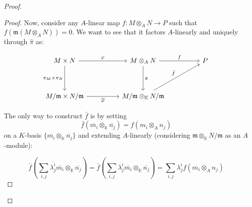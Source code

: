 \begin{problem}
\begin{enumerate}[label=(\theproblem.\arabic*),ref=\theproblem.\arabic*]
\begin{sol}
\begin{proof}
\begin{claim}
\begin{proof}
                                Now, consider any $A$-linear map $f: M \otimes_A N \rightarrow P$ such that $f(\mathfrak{m}(M \otimes_A N)) = 0$.
                                We want to see that it factors $A$-linearly and uniquely through $\hat{\pi}$ as:

                                \begin{center}
                                    \[\begin{tikzcd}
                                    {M \times N} && {M \otimes_A N} && P \\
                                    \\
                                    {M / \mathfrak{m} \times N / \mathfrak{m}} && {M / \mathfrak{m} \otimes_{\mathbb{K}} N / \mathfrak{m}}
                                    \arrow["\varphi", from=1-1, to=1-3]
                                    \arrow["{\hat{\pi}}", from=1-3, to=3-3]
                                    \arrow["{\pi_M\times\pi_N}"', from=1-1, to=3-1]
                                    \arrow["{\overline{\varphi}}"', from=3-1, to=3-3]
                                    \arrow["f", from=1-3, to=1-5]
                                    \arrow["{\bar{f}}", from=3-3, to=1-5]
                                \end{tikzcd}\]

                                \end{center}

                                The only way to construct
                                $\bar{f}$ is by setting \[{\bar{f}(\overline{m_i} \otimes_{\mathbb{K}} \overline{n_j}) = f(m_i \otimes_A n_j)}\]
                                on a $K$-basis $\{\overline{m_i} \otimes_{\mathbb{K}} \overline{n_j}\}$ and extending $A$-linearly (considering $\mathfrak{m} \otimes_{\mathbb{K}} N / \mathfrak{m}$ as an $A$-module):

                                \[
                                    \bar{f} \left( \sum_{i,j} \overline{\lambda^i_j} \overline{m_i} \otimes_\mathbb{K} \overline{n_j} \right) =
                                    \bar{f} \left( \sum_{i,j} \lambda^i_j \overline{m_i} \otimes_\mathbb{K} \overline{n_j} \right) =
                                    \sum_{i,j} \lambda^i_j f(m_i \otimes_A n_j)
                                \]


\end{proof}
\end{claim}
\end{proof}
\end{sol}
\end{enumerate}
\end{problem}
